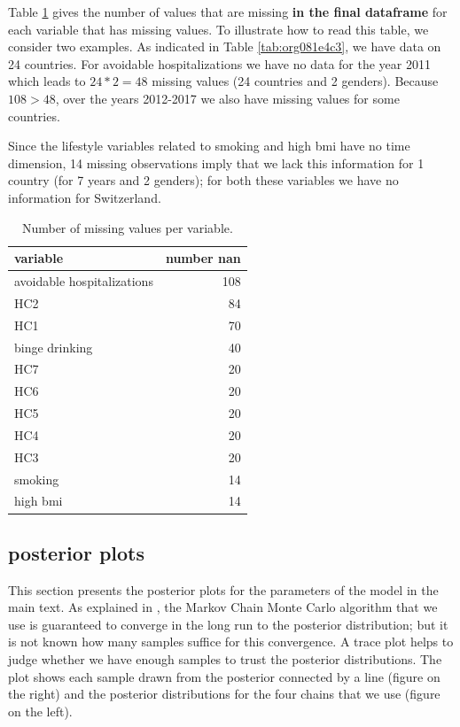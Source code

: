 \documentclass[12pt,english,a4paper]{article}
\begin{document}
Table \ref{tab:orgd43daa3} gives the number of values that are missing \textbf{in the final dataframe} for each variable that has missing values. To illustrate how to read this table, we consider two examples. As indicated in Table \ref{tab:org081e4c3}, we have data on 24 countries. For avoidable hospitalizations we have no data for the year 2011 which leads to \(24*2 = 48\) missing values (24 countries and 2 genders). Because \(108>48\), over the years 2012-2017 we also have missing values for some countries.

Since the lifestyle variables related to smoking and high bmi have no time dimension, 14 missing observations imply that we lack this information for 1 country (for 7 years and 2 genders); for both these variables we have no information for Switzerland.

\begin{table}[htbp]
\caption{\label{tab:orgd43daa3}Number of missing values per variable.}
\centering
\begin{tabular}{lr}
variable & number nan\\
\hline
avoidable hospitalizations & 108\\
HC2 & 84\\
HC1 & 70\\
binge drinking & 40\\
HC7 & 20\\
HC6 & 20\\
HC5 & 20\\
HC4 & 20\\
HC3 & 20\\
smoking & 14\\
high bmi & 14\\
\end{tabular}
\end{table}

\subsection{posterior plots}
\label{sec:orgfaedced}

This section presents the posterior plots for the parameters of the model in the main text. As explained in \cite{mcelreath}, the Markov Chain Monte Carlo algorithm that we use is guaranteed to converge in the long run to the posterior distribution; but it is not known how many samples suffice for this convergence. A trace plot helps to judge whether we have enough samples to trust the posterior distributions. The plot shows each sample drawn from the posterior connected by a line (figure on the right) and the posterior distributions for the four chains that we use (figure on the left).
\end{document}
